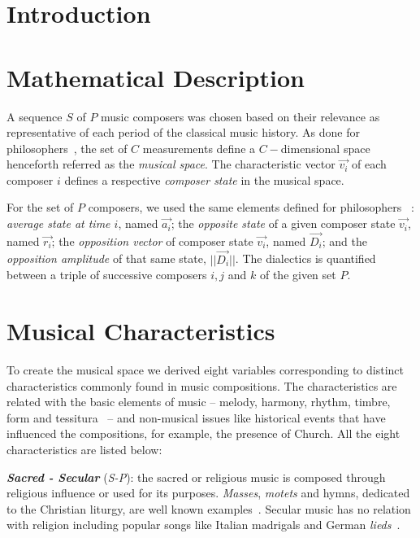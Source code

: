 \documentclass[
 aip,
 jmp,
 amsmath,amssymb,
 reprint,
]{revtex4-1}
\begin{document}
\maketitle

\section{\label{sec:level1}Introduction}

\section{Mathematical Description}

A sequence $S$ of $P$ music composers was chosen based on their
relevance as representative of each period of the classical music history.
As done for philosophers~\cite{Fabbri}, the set of $C$ measurements
define a $C-$dimensional space henceforth referred as the \emph{musical space}.  
The characteristic vector $\vec{v_i}$ of each composer $i$ defines a respective
\emph{composer state} in the musical space.  

For the set of
$P$ composers, we used the same elements defined for philosophers
~\cite{Fabbri}: \emph{average state at time $i$}, named $\vec{a_i}$;
the \emph{opposite state} of a given composer state $\vec{v_i}$, named $\vec{r_i}$;
the \emph{opposition vector} of composer state $\vec{v_i}$, named
$\vec{D_i}$; and the \emph{opposition
amplitude} of that same state, $|| \vec{D_i} ||$.
The dialectics is quantified between a triple of successive composers
 $i, j$ and $k$ of the given set $P$.


\section{Musical Characteristics}

To create the musical space we derived eight variables corresponding to
distinct characteristics commonly found in music compositions. The
characteristics are related with the basic elements of music -- melody,
harmony, rhythm, timbre, form and tessitura~\cite{BennettHistory} -- and
non-musical issues like historical events that have influenced the
compositions, for example, the
presence of Church. All the eight
characteristics are listed below:

{\bf \em{ Sacred - Secular}} (\emph{S-P}): the sacred or religious music is
composed through religious influence or used for its purposes. \textit{Masses},
\textit{motets} and hymns, dedicated to the Christian liturgy, are well known examples~\cite{Lovelock}. Secular
music has no relation with religion including
popular songs like Italian madrigals and German \textit{lieds}~\cite{BennettHistory}. 
\end{document}
